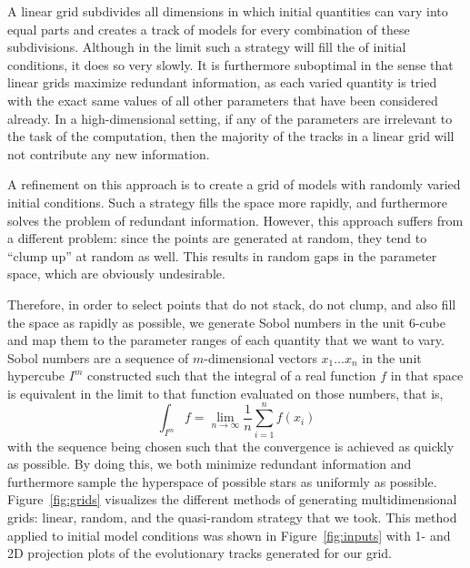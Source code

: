 A linear grid subdivides all dimensions in which initial quantities can vary into equal parts and creates a track of models for every combination of these subdivisions. Although in the limit such a strategy will fill the  of initial conditions, it does so very slowly. It is furthermore suboptimal in the sense that linear grids maximize redundant information, as each varied quantity is tried with the exact same values of all other parameters that have been considered already. In a high-dimensional setting, if any of the parameters are irrelevant to the task of the computation, then the majority of the tracks in a linear grid will not contribute any new information.

A refinement on this approach is to create a grid of models with randomly varied initial conditions. Such a strategy fills the space more rapidly, and furthermore solves the problem of redundant information. However, this approach suffers from a different problem: since the points are generated at random, they tend to ``clump up'' at random as well. This results in random gaps in the parameter space, which are obviously undesirable. 

Therefore, in order to select points that do not stack, do not clump, and also fill the space as rapidly as possible, we generate Sobol numbers \citep{sobol1967distribution} in the unit 6-cube and map them to the parameter ranges of each quantity that we want to vary. Sobol numbers are a sequence of $m$-dimensional vectors ${x_1 \ldots x_n}$ in the unit hypercube $I^m$ constructed such that the integral of a real function $f$ in that space is equivalent in the limit to that function evaluated on those numbers, that is,
\begin{equation}
    \int_{I^m} f = \lim_{n \to \infty} \frac{1}{n}\sum_{i=1}^n f(x_i)
\end{equation}
with the sequence being chosen such that the convergence is achieved as quickly as possible. By doing this, we both minimize redundant information and furthermore sample the hyperspace of possible stars as uniformly as possible. Figure~\ref{fig:grids} visualizes the different methods of generating multidimensional grids: linear, random, and the quasi-random strategy that we took. This method applied to initial model conditions was shown in Figure~\ref{fig:inputs} with 1- and 2D projection plots of the evolutionary tracks generated for our grid. 

